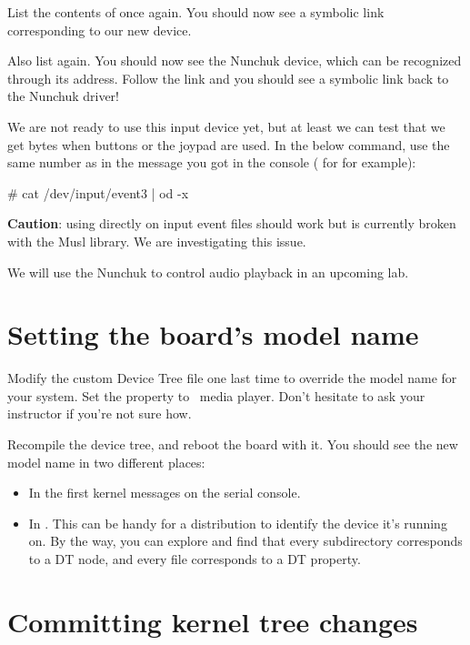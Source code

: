 List the contents of  once again. You
should now see a symbolic link corresponding to our new device.

Also list  again. You should now see the
Nunchuk device, which can be recognized through its  address.
Follow the link and you should see a symbolic link back to the Nunchuk
driver!

We are not ready to use this input device yet, but at least we can test
that we get bytes when buttons or the joypad are used. In the below
command, use the same number as in the message you got in the console
( for  for example):

\begin{bashinput}
# cat /dev/input/event3 | od -x
\end{bashinput}

{\bf Caution}: using  directly on input event files should
work but is currently broken with the Musl library. We are investigating
this issue.

We will use the Nunchuk to control audio playback in an upcoming lab.

\section{Setting the board's model name}

Modify the custom Device Tree file one last time to override the model
name for your system. Set the  property to
\labboard\ media player. Don't hesitate to ask your
instructor if you're not sure how.

Recompile the device tree, and reboot the board with it. You should see
the new model name in two different places:

\begin{itemize}
\item In the first kernel messages on the serial console.
\item In . This can be
      handy for a distribution to identify the device it's running on.
      By the way, you can explore  and
      find that every subdirectory corresponds to a DT node, and every
      file corresponds to a DT property.
\end{itemize}

\section{Committing kernel tree changes}

